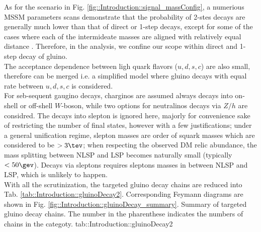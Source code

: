 As for the scenario in Fig. \ref{fig::Introduction::signal_massConfig}, a numerious MSSM parameters scans demonstrate that the probability of 2-stes decays are generally much lower than that of direct or 1-step decays, except for some of the cases where each of the intermideate masses are aligned with relatively equal distance 
. Therefore, in the analysis, we confine our scope within direct and 1-step decay of gluino. \\

The acceptance dependence between ligh quark flavors ($u,d,s,c$) are also small, therefore can be merged i.e. a simplified model where gluino decays with equal rate between $u,d,s,c$ is considered. \\

For seb-sequent gaugino decays, charginos are assumed always decays into on-shell or off-shell $W$-boson, while two options for neutralinos decays via $Z/h$ are considred. The decays into slepton is ignored here, majorly for convenience sake of restricting the number of final states, however with a few justifications; under a general unification regime, slepton masses are order of squark masses which are considered to be $>3\tev$; when respecting the observed DM relic abundance, the mass splitting between NLSP and LSP becomes naturally small (typically $<50\gev$). Decays via sleptons requires sleptons masses in between NLSP and LSP, which is unlikely to happen. \\

With all the scrutinization, the targeted gluino decay chains are reduced into Tab. \ref{tab::Introduction::gluinoDecay2}.
Corresponding Feymann diagrams are shown in Fig. \ref{fig::Introduction::gluinoDecay_summary}. 
{Summary of targeted gluino decay chains. The number in the pharenthese indicates the numbers of chains in the categoty.}
{tab::Introduction::gluinoDecay2}


